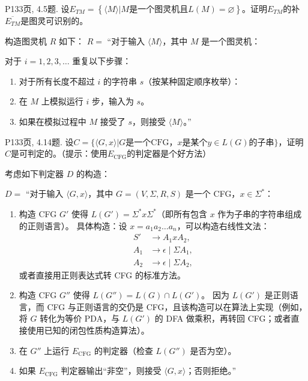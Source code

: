 \documentclass[11pt,addpoints,answers]{exam}
\begin{document}
\begin{questions}
	\question P133页, 4.5题.
	设$E_{\textit{TM}}=\left\{ \langle M \rangle| M\text{是一个图灵机} \text{且} L(M)= \varnothing \right\}$。证明$E_{\textit{TM}}$的补$\overline{E_{\textit{TM}}}$是图灵可识别的。
	\begin{solution}
    
		构造图灵机 $R$ 如下：
        $R =$ “对于输入 $\langle M \rangle$，其中 $M$ 是一个图灵机：
        
        对于 $i = 1,2,3,\dots$ 重复以下步骤：
        \begin{enumerate}
            \item 对于所有长度不超过 $i$ 的字符串 $s$（按某种固定顺序枚举）：
            \item 在 $M$ 上模拟运行 $i$ 步，输入为 $s$。
            \item 如果在模拟过程中 $M$ 接受了 $s$，则接受 $\langle M \rangle$。”
        \end{enumerate}
	\end{solution}
	
	\question P133页, 4.14题.
	设$C=\{\langle G,x\rangle|G\text{是一个CFG，}x\text{是某个}y\in L(G)\text{的子串}\}$，证明$C$是可判定的。（提示：使用$E_\text{CFG}$的判定器是个好方法）
	\begin{solution}
		考虑如下判定器 \(D\) 的构造：

        \(D =\) “对于输入 \(\langle G, x \rangle\)，其中 \(G = (V, \Sigma, R, S)\) 是一个 CFG，\(x \in \Sigma^*\)：
        \begin{enumerate}
            \item 构造 CFG \(G'\) 使得 \(L(G') = \Sigma^* x \Sigma^*\)（即所有包含 \(x\) 作为子串的字符串组成的正则语言）。  
                  具体构造：设 \(x = a_1 a_2 \dots a_n\)，可以构造右线性文法：
                  \begin{align*}
                      S' &\to A_1 x A_2, \\
                      A_1 &\to \epsilon \mid \Sigma A_1, \\
                      A_2 &\to \epsilon \mid \Sigma A_2,
                  \end{align*}
                  或者直接用正则表达式转 CFG 的标准方法。
            \item 构造 CFG \(G''\) 使得 \(L(G'') = L(G) \cap L(G')\)。  
                  因为 \(L(G')\) 是正则语言，而 CFG 与正则语言的交仍是 CFG，且该构造可以在算法上实现（例如，将 \(G\) 转化为等价 PDA，与 \(L(G')\) 的 DFA 做乘积，再转回 CFG；或者直接使用已知的闭包性质构造算法）。
            \item 在 \(G''\) 上运行 \(E_{\text{CFG}}\) 的判定器（检查 \(L(G'')\) 是否为空）。
            \item 如果 \(E_{\text{CFG}}\) 判定器输出“非空”，则接受 \(\langle G,x\rangle\)；否则拒绝。”
        \end{enumerate}
                

\end{solution}
\end{questions}
\end{document}
